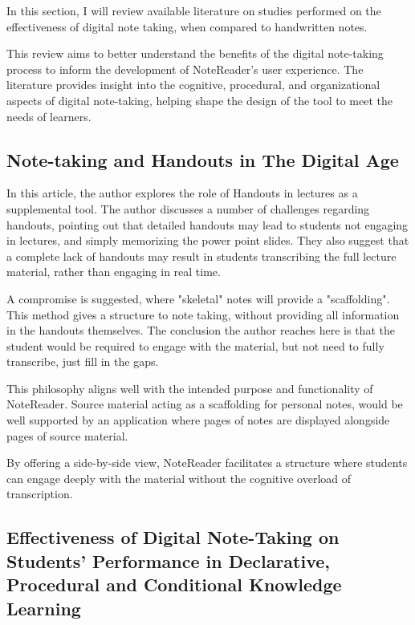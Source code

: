     In this section, I will review available literature on studies performed on the effectiveness of digital note taking, when compared to handwritten notes. 
    
    This review aims to better understand the benefits of the digital note-taking process to inform the development of NoteReader's user experience. The literature provides insight into the cognitive, procedural, and organizational aspects of digital note-taking, helping shape the design of the tool to meet the needs of learners.
 
    
    \subsection{Note-taking and Handouts in The Digital Age\cite{stacy_note_taking_2015}}

    In this article, the author explores the role of Handouts in lectures as a supplemental tool. The author discusses a number of challenges regarding handouts, pointing out that detailed handouts may lead to students not engaging in lectures, and simply memorizing the power point slides. They also suggest that a complete lack of handouts may result in students transcribing the full lecture material, rather than engaging in real time. 

    A compromise is suggested, where "skeletal" notes will provide a "scaffolding". This method gives a structure to note taking, without providing all information in the handouts themselves. The conclusion the author reaches here is that the student would be required to engage with the material, but not need to fully transcribe, just fill in the gaps. 

    This philosophy aligns well with the intended purpose and functionality of NoteReader. Source material acting as a scaffolding for personal notes, would be well supported by an application where pages of notes are displayed alongside pages of source material.

    By offering a side-by-side view, NoteReader facilitates a structure where students can engage deeply with the material without the cognitive overload of transcription.
    
    \subsection{Effectiveness of Digital Note-Taking on Students’ Performance in Declarative, Procedural and Conditional Knowledge Learning\cite{Sun2019}}
    

